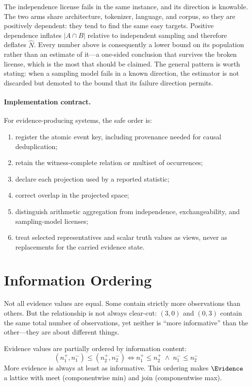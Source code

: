 \documentclass[11pt,openany]{report}
\begin{document}
The independence license fails in the same instance, and its direction is
knowable.  The two arms share architecture, tokenizer, language, and corpus,
so they are positively dependent: they tend to find the same easy targets.
Positive dependence inflates $|A\cap B|$ relative to independent sampling and
therefore deflates $\hat N$.  Every number above is consequently a lower bound
on its population rather than an estimate of it---a one-sided conclusion that
survives the broken license, which is the most that should be claimed.  The
general pattern is worth stating: when a sampling model fails in a known
direction, the estimator is not discarded but demoted to the bound that its
failure direction permits.

\paragraph{Implementation contract.}
For evidence-producing systems, the safe order is:
\begin{enumerate}
\item register the atomic event key, including provenance needed for causal
  deduplication;
\item retain the witness-complete relation or multiset of occurrences;
\item declare each projection used by a reported statistic;
\item correct overlap in the projected space;
\item distinguish arithmetic aggregation from independence, exchangeability,
  and sampling-model licenses;
\item treat selected representatives and scalar truth values as views, never
  as replacements for the carried evidence state.
\end{enumerate}

\section{Information Ordering}

Not all evidence values are equal.  Some contain strictly more
observations than others.  But the relationship is not always clear-cut:
$(3, 0)$ and $(0, 3)$ contain the same total number of observations, yet
neither is ``more informative'' than the other---they are about different
things.

Evidence values are partially ordered by information content:
\[
  (n_1^+, n_1^-) \le (n_2^+, n_2^-) \iff
  n_1^+ \le n_2^+ \;\wedge\; n_1^- \le n_2^-
\]
More evidence is always at least as informative.  This ordering makes
$\Evidence$ a lattice with meet (componentwise min) and join (componentwise
max).
\end{document}
